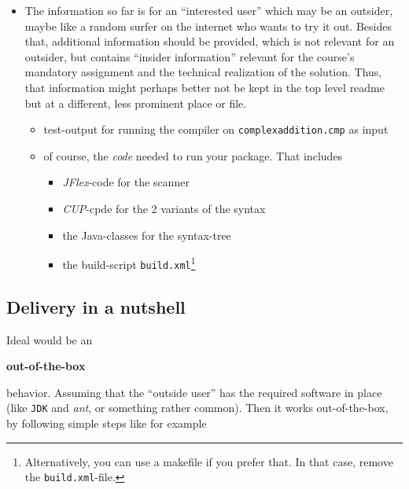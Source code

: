 \documentclass[10pt,freeform]{handout}[2014/08/13]
\begin{document}
\begin{itemize}
\item The information so far is for an ``interested user'' which may be an
  outsider, maybe like a random surfer on the internet who wants to try it
  out. Besides that, additional information should be provided, which is
  not relevant for an outsider, but contains ``insider information''
  relevant for the course's mandatory assignment and the technical
  realization of the solution. Thus, that information might perhaps better
  not be kept in the top level readme but at a different, less prominent
  place or file.
  \begin{itemize}
  \item test-output for running the compiler on \texttt{complexaddition.cmp} as
    input
  \item of course, the \emph{code} needed to run your package. That
    includes
    \begin{itemize}
    \item \textsl{JFlex}-code for the scanner
    \item \textsl{CUP}-cpde for the 2 variants of the syntax
    \item the Java-classes for the syntax-tree
    \item the build-script \texttt{build.xml}\footnote{Alternatively, you
        can use a makefile if you prefer that. In that case, remove the
        \texttt{build.xml}-file.}
    \end{itemize}
  \end{itemize}
\end{itemize}



\subsection{Delivery in a nutshell}
\label{sec:delivery-nutshell}


Ideal would be an 
\begin{center}
  \textbf{out-of-the-box}
\end{center}
behavior. Assuming that the ``outside user'' has the required software in
place (like \texttt{JDK} and \emph{ant}, or something rather common). Then
it works out-of-the-box, by following simple steps like for example
\end{document}
